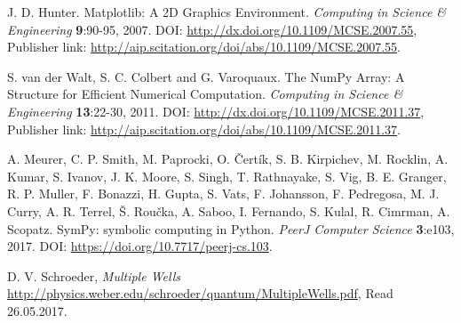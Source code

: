 \documentclass[../main.tex]{subfiles}
\begin{document}
\begin{thebibliography}{99}
 J. D. Hunter. Matplotlib: A 2D Graphics Environment. \emph{Computing in Science \& Engineering} \textbf{9}:90-95, 2007. DOI: \url{http://dx.doi.org/10.1109/MCSE.2007.55}, Publisher link: \url{http://aip.scitation.org/doi/abs/10.1109/MCSE.2007.55}.

 S. van der Walt, S. C. Colbert and G. Varoquaux. The NumPy Array: A Structure for Efficient Numerical Computation. \emph{Computing in Science \& Engineering} \textbf{13}:22-30, 2011.  DOI: \url{http://dx.doi.org/10.1109/MCSE.2011.37}, Publisher link: \url{http://aip.scitation.org/doi/abs/10.1109/MCSE.2011.37}.

 A. Meurer, C. P. Smith, M. Paprocki, O. Čertík, S. B. Kirpichev, M. Rocklin, A. Kumar, S. Ivanov, J. K. Moore, S. Singh, T. Rathnayake, S. Vig, B. E. Granger, R. P. Muller, F. Bonazzi, H. Gupta, S. Vats, F. Johansson, F. Pedregosa, M. J. Curry, A. R. Terrel, Š. Roučka, A. Saboo, I. Fernando, S. Kulal, R. Cimrman, A. Scopatz. SymPy: symbolic computing in Python. \emph{PeerJ Computer Science} \textbf{3}:e103, 2017. DOI: \url{https://doi.org/10.7717/peerj-cs.103}.

 D. V. Schroeder, \emph{Multiple Wells} \url{http://physics.weber.edu/schroeder/quantum/MultipleWells.pdf}, Read 26.05.2017.



\end{thebibliography}
\end{document}
